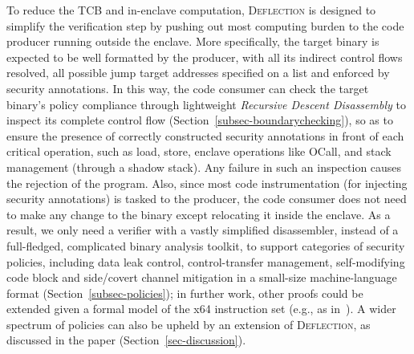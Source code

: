 To reduce the TCB and in-enclave computation, \textsc{Deflection} is designed to simplify the verification step by pushing out most computing burden to the code producer running outside the enclave. More specifically, the target binary is expected to be well formatted by the producer, with all its indirect control flows resolved, all possible jump target addresses specified on a list and enforced by security annotations.  In this way, the code consumer can check the target binary's policy compliance through lightweight \textit{Recursive Descent Disassembly} to inspect its complete control flow (Section~\ref{subsec-boundarychecking}), so as to ensure the presence of correctly constructed security annotations in front of each critical operation, such as load, store, enclave operations like OCall, and stack management (through a shadow stack). Any failure in such an inspection causes the rejection of the program. Also, since most code instrumentation (for injecting security annotations) is tasked to the producer, the code consumer does not need to make any change to the binary except relocating it inside the enclave. As a result, we only need a verifier with a vastly simplified disassembler, instead of a full-fledged, complicated binary analysis toolkit, to support categories of security policies, including data leak control, control-transfer management, self-modifying code block and side/covert channel mitigation in a small-size machine-language format (Section~\ref{subsec-policies}); in further work, other proofs could be extended given a formal model of the x64 instruction set (e.g., as in~\cite{morrisett1999system}).
A wider spectrum of policies can also be upheld by an extension of \textsc{Deflection}, as discussed in the paper (Section~\ref{sec-discussion}). 




